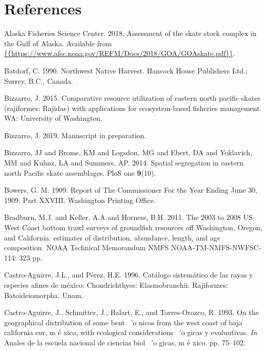 \documentclass[12pt,]{article}
\begin{document}
\newpage

\color{black}

\hypertarget{references}{%
\section*{References}\label{references}}

\renewcommand{\thepage}{}

\hypertarget{refs}{}
\leavevmode\hypertarget{ref-AFSC2018}{}%
Alaska Fisheries Science Center. 2018. Assessment of the skate stock
complex in the Gulf of Alaska. Available from
\href{\%7B\%7Bhttps://www.afsc.noaa.gov/REFM/Docs/2018/GOA/GOAskate.pdf\%7D\%7D}{\{\{https://www.afsc.noaa.gov/REFM/Docs/2018/GOA/GOAskate.pdf\}\}}.

\leavevmode\hypertarget{ref-Batdorf1990}{}%
Batdorf, C. 1990. Northwest Native Harvest. Hancock House Publishers
Ltd.; Surrey, B.C., Canada.

\leavevmode\hypertarget{ref-Bizzarro2015}{}%
Bizzarro, J. 2015. Comparative resource utilization of eastern north
pacific skates (rajiformes: Rajidae) with applications for
ecosystem-based fisheries management. WA: University of Washington.

\leavevmode\hypertarget{ref-Bizzarro2019}{}%
Bizzarro, J. 2019. Manuscript in preparation.

\leavevmode\hypertarget{ref-Bizzarro2014}{}%
Bizzarro, JJ and Broms, KM and Logsdon, MG and Ebert, DA and Yoklavich,
MM and Kuhnz, LA and Summers, AP. 2014. Spatial segregation in eastern
north Pacific skate assemblages. PloS one \textbf{9}(10).

\leavevmode\hypertarget{ref-Bowers1909}{}%
Bowers, G. M. 1909. Report of The Commissioner For the Year Ending June
30, 1909. Part XXVIII. Washington Printing Office.

\leavevmode\hypertarget{ref-Bradburn2011}{}%
Bradburn, M.J. and Keller, A.A and Horness, B.H. 2011. The 2003 to 2008
US West Coast bottom trawl surveys of groundfish resources off
Washington, Oregon, and California: estimates of distribution,
abundance, length, and age composition. NOAA Technical Memorandum NMFS
NOAA-TM-NMFS-NWFSC-114: 323 pp.

\leavevmode\hypertarget{ref-Castro1996}{}%
Castro-Aguirre, J.L., and Pérez, H.E. 1996. Catálogo sistemático de las
rayas y especies afines de méxico: Chondrichthyes: Elasmobranchii:
Rajiformes: Batoideiomorpha. Unam.

\leavevmode\hypertarget{ref-Castro1993}{}%
Castro-Aguirre, J., Schmitter, J., Balart, E., and Torres-Orozco, R.
1993. On the geographical distribution of some bent ~'o nicos from the
west coast of baja california sur, m é xico, with ecological
considerations ~'o gicas y evoluutivas. \emph{In} Anales de la escuela
nacional de ciencias biol ~'o gicas, m é xico. pp. 75--102.
\end{document}
